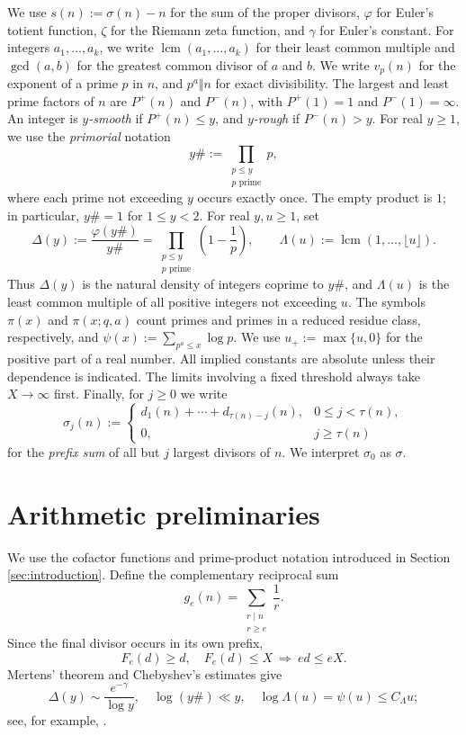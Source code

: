\documentclass[11pt,letterpaper,reqno]{amsart}
\numberwithin{equation}{section}
\theoremstyle{remark}
\newcommand{\1}{\mathbf 1}
\DeclareMathOperator{\lcm}{lcm}
\renewcommand{\leq}{\leqslant}
\renewcommand{\geq}{\geqslant}
\begin{document}
We use $s(n):=\sigma(n)-n$ for the sum of the proper divisors,
$\varphi$ for Euler's totient function, $\zeta$ for the Riemann zeta
function, and $\gamma$ for Euler's constant. For integers
$a_1,\ldots,a_k$, we write $\lcm(a_1,\ldots,a_k)$ for their least
common multiple and $\gcd(a,b)$ for the greatest common divisor of $a$ and $b$.
We write $v_p(n)$ for the exponent of a prime $p$ in $n$, and
$p^a\Vert n$ for exact divisibility. The largest and least prime factors of $n$
are $P^+(n)$ and $P^-(n)$, with $P^+(1)=1$ and $P^-(1)=\infty$.
An integer is \emph{$y$-smooth} if $P^+(n)\leq y$, and \emph{$y$-rough} if
$P^-(n)>y$. For real $y\geq1$, we use the \emph{primorial} notation
\[
 y\#:=\prod_{\substack{p\leq y\\p\text{ prime}}}p,
\]
where each prime not exceeding $y$ occurs exactly once. The empty product
is $1$; in particular, $y\#=1$ for $1\leq y<2$. For real $y,u\geq1$, set
\[
 \Delta(y):=\frac{\varphi(y\#)}{y\#}
 =\prod_{\substack{p\leq y\\p\text{ prime}}}\left(1-\frac1p\right),
 \qquad
 \Lambda(u):=\lcm(1,\ldots,\lfloor u\rfloor).
\]
Thus $\Delta(y)$ is the natural density of integers coprime to $y\#$,
and $\Lambda(u)$ is the least common multiple of all positive integers
not exceeding $u$.
The symbols $\pi(x)$ and $\pi(x;q,a)$ count primes and primes in a
reduced residue class, respectively, and
$\psi(x):=\sum_{p^a\leq x}\log p$.
We use $u_+:=\max\{u,0\}$ for the positive part of a real number.
All implied constants are absolute unless their dependence is indicated.
The limits involving a fixed threshold always take $X\to\infty$ first.
Finally, for $j\geq0$ we write
\[
 \sigma_j(n):=
 \begin{cases}
 d_1(n)+\cdots+d_{\tau(n)-j}(n),&0\leq j<\tau(n),\\
 0,&j\geq\tau(n)
 \end{cases}
\]
for the \emph{prefix sum} of all but $j$ largest divisors of $n$. We interpret $\sigma_0$ as $\sigma$.


\section{Arithmetic preliminaries}
\label{sec:arithmetic-preliminaries}

We use the cofactor functions and prime-product notation introduced in
Section \ref{sec:introduction}. Define the complementary reciprocal sum
\[
 g_e(n)=\sum_{\substack{r\mid n\\r\geq e}}\frac1r.
\]
Since the final divisor occurs in its own prefix,
\[
 F_e(d)\geq d,\quad F_e(d)\leq X\ \Longrightarrow\ ed\leq eX.
\]
Mertens' theorem and Chebyshev's estimates give
\[
 \Delta(y)\sim\frac{e^{-\gamma}}{\log y},
 \quad \log(y\#)\ll y,
 \quad \log\Lambda(u)=\psi(u)\leq C_\Lambda u;
\]
see, for example, \cite{Tenenbaum}.
\end{document}
